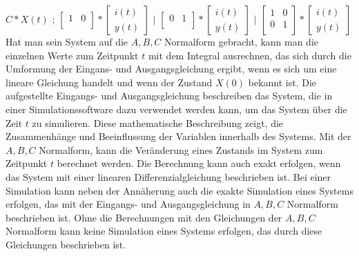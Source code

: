 \documentclass[11pt, a4paper, twoside]{article}   	%
\begin{document}
\newline
\newline
$
C
*
X(t)
$
;
$
\begin{bmatrix}
	1 & 0\\[0.3em]
\end{bmatrix}
*
\begin{bmatrix}
	i(t)  \\[0.3em]
	y(t)
\end{bmatrix}$
\hspace{1mm}
$|$
\hspace{1mm}
$
\begin{bmatrix}
	0 & 1\\[0.3em]
\end{bmatrix}
*
\begin{bmatrix}
	i(t)  \\[0.3em]
	y(t)
\end{bmatrix} 
$
\hspace{1mm}
$|$
\hspace{1mm}
$
\begin{bmatrix}
	1 & 0\\[0.3em]
	0 & 1\\[0.3em]
\end{bmatrix}
*
\begin{bmatrix}
	i(t)  \\[0.3em]
	y(t)
\end{bmatrix} 
$
\newline
\newline
\newline
Hat man sein System auf die $A, B, C$ Normalform gebracht, kann man die einzelnen Werte zum Zeitpunkt $t$ mit dem Integral ausrechnen, das sich durch die Umformung der Eingans- und Ausgangsgleichung ergibt, wenn es sich um eine lineare Gleichung handelt und wenn der Zustand $X(0)$ bekannt ist. Die aufgestellte Eingangs- und Ausgangsgleichung beschreiben das System, die in einer Simulationssoftware dazu verwendet werden kann, um das System über die Zeit $t$ zu simulieren. 
\newline
\newline
Diese mathematische Beschreibung zeigt, die Zusammenhänge und Beeinflussung der Variablen innerhalb des Systems. Mit der $A, B, C$ Normalform, kann die Veränderung eines Zustands im System zum Zeitpunkt $t$ berechnet werden. Die Berechnung kann auch exakt erfolgen, wenn das System mit einer linearen Differenzialgleichung beschrieben ist.
\newline
\newline
Bei einer Simulation kann neben der Annäherung auch die exakte Simulation eines Systems erfolgen, das mit der Eingangs- und Ausgangsgleichung in $A, B, C$ Normalform beschrieben ist. Ohne die Berechnungen mit den Gleichungen der $A, B, C$ Normalform kann keine Simulation eines Systems erfolgen, das durch diese Gleichungen beschrieben ist.
\newpage
\end{document}
